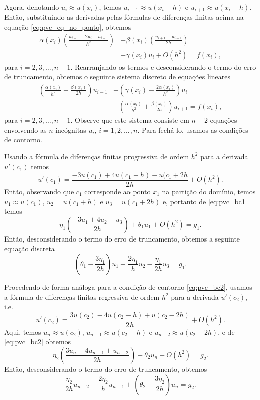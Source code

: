 Agora, denotando $u_i \approx u(x_i)$, temos $u_{i-1}\approx u(x_i-h)$ e $u_{i+1}\approx u(x_i+h)$. Então, substituindo as derivadas pelas fórmulas de diferenças finitas acima na equação \eqref{eq:pvc_eq_no_ponto}, obtemos
\begin{align}
  \alpha(x_i)\left(\frac{u_{i-1}-2u_i+u_{i+1}}{h^2}\right) &+ \beta(x_i)\left(\frac{u_{i+1}-u_{i-1}}{2h}\right) \nonumber \\
  &+ \gamma(x_i)u_i + O(h^2) = f(x_i),
\end{align}
para $i=2, 3, \dotsc, n-1$. Rearranjando os termos e desconsiderando o termo do erro de truncamento, obtemos o seguinte sistema discreto de equações lineares
\begin{align}
  \left(\frac{\alpha(x_i)}{h^2}-\frac{\beta(x_i)}{2h}\right)u_{i-1} &+ \left(\gamma(x_i) - \frac{2\alpha(x_i)}{h^2}\right)u_i \nonumber \\
  &+ \left(\frac{\alpha(x_i)}{h^2}+\frac{\beta(x_i)}{2h}\right)u_{i+1} = f(x_i), \label{eq:pvc_mdf_sis1}
\end{align}
para $i=2, 3, \dotsc, n-1$. Observe que este sistema consiste em $n-2$ equações envolvendo as $n$ incógnitas $u_i$, $i=1, 2, \dotsc, n$. Para fechá-lo, usamos as condições de contorno.

Usando a fórmula de diferenças finitas progressiva de ordem $h^2$ para a derivada $u'(c_1)$ temos
\begin{equation}
  u'(c_1) = \frac{-3u(c_1) + 4u(c_1+h) - u(c_1+2h}{2h} + O(h^2).
\end{equation}
Então, observando que $c_1$ corresponde ao ponto $x_1$ na partição do domínio, temos $u_1 \approx u(c_1)$, $u_2 = u(c_1+h)$ e $u_3 = u(c_1+2h)$ e, portanto de \eqref{eq:pvc_bc1} temos
\begin{equation}
  \eta_1\left(\frac{-3u_1 + 4u_2 - u_3}{2h}\right) + \theta_1u_1 + O(h^2) = g_1.
\end{equation}
Então, desconsiderando o termo do erro de truncamento, obtemos a seguinte equação discreta
\begin{equation}
  \left(\theta_1 - \frac{3\eta_1}{2h}\right)u_1 + \frac{2\eta_1}{h}u_2 - \frac{\eta_1}{2h}u_3 = g_1.\label{eq:pvc_mdf_sis0}
\end{equation}

Procedendo de forma análoga para a condição de contorno \eqref{eq:pvc_bc2}, usamos a fórmula de diferenças finitas regressiva de ordem $h^2$ para a derivada $u'(c_2)$, i.e.
\begin{equation}
  u'(c_2) = \frac{3u(c_2) - 4u(c_2-h)+u(c_2-2h)}{2h} + O(h^2).
\end{equation}
Aqui, temos $u_{n}\approx u(c_2)$, $u_{n-1}\approx u(c_2-h)$ e $u_{n-2}\approx u(c_2-2h)$, e de \eqref{eq:pvc_bc2} obtemos
\begin{equation}
  \eta_2\left(\frac{3u_n - 4u_{n-1} + u_{n-2}}{2h}\right) + \theta_2u_n + O(h^2) = g_2.
\end{equation}
Então, desconsiderando o termo do erro de truncamento, obtemos
\begin{equation}
  \frac{\eta_2}{2h}u_{n-2} - \frac{2\eta_2}{h}u_{n-1} + \left(\theta_2 + \frac{3\eta_2}{2h}\right)u_n = g_2.\label{eq:pvc_mdf_sis2}
\end{equation}

